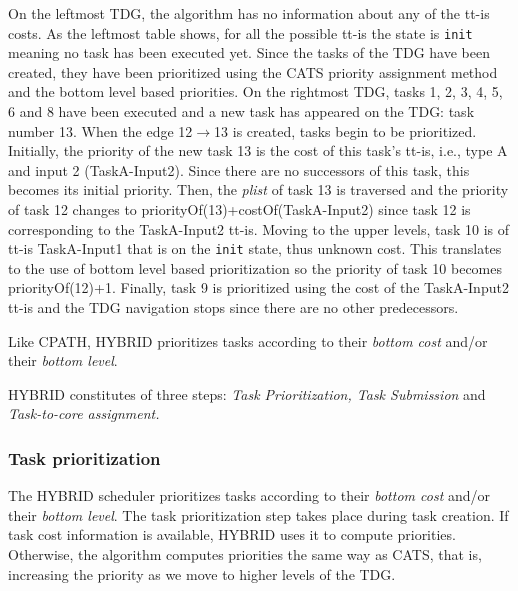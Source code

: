 On the leftmost TDG, the algorithm has no information about any of the tt-is costs.
As the leftmost table shows, for all the possible tt-is the state is \texttt{init} meaning no task has been executed yet.
Since the tasks of the TDG have been created, they have been prioritized using the CATS priority assignment method and the bottom level based priorities.
On the rightmost TDG, tasks 1, 2, 3, 4, 5, 6 and 8 have been executed and a new task has appeared on the TDG: task number 13.
When the edge 12$\rightarrow$13 is created, tasks begin to be prioritized.
Initially, the priority of the new task 13 is the cost of this task's tt-is, i.e., type A and input 2 (TaskA-Input2). 
Since there are no successors of this task, this becomes its initial priority.
Then, the \textit{plist} of task 13 is traversed and the priority of task 12 changes to priorityOf(13)+costOf(TaskA-Input2) since task 12 is corresponding to the TaskA-Input2 tt-is.
Moving to the upper levels, task 10 is of tt-is TaskA-Input1 that is on the \texttt{init} state, thus unknown cost.
This translates to the use of bottom level based prioritization so the priority of task 10 becomes priorityOf(12)+1.
Finally, task 9 is prioritized using the cost of the TaskA-Input2 tt-is and the TDG navigation stops since there are no other predecessors.



Like CPATH, HYBRID prioritizes tasks according to their \textit{bottom cost} and/or their \textit{bottom level}.

HYBRID constitutes of three steps: \textit{Task Prioritization, Task Submission} and \textit{Task-to-core assignment.}


\subsubsection{Task prioritization}
The HYBRID scheduler prioritizes tasks according to their \textit{bottom cost} and/or their \textit{bottom level}.
The task prioritization step takes place during task creation.
If task cost information is available, HYBRID uses it to compute priorities.
Otherwise, the algorithm computes priorities the same way as CATS, that is, increasing the priority as we move to higher levels of the TDG.

